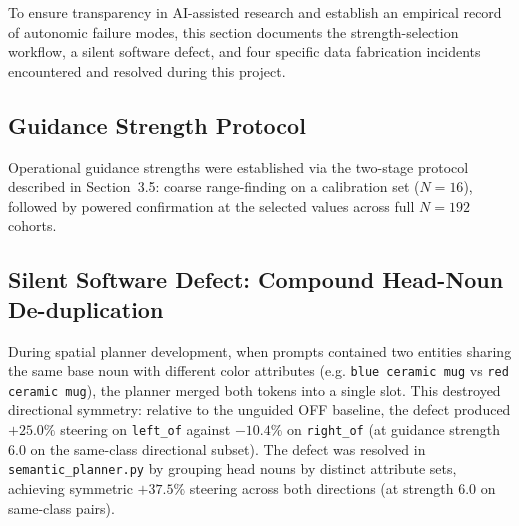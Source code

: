 \documentclass[10pt,twocolumn,letterpaper]{article}
\begin{document}
To ensure transparency in AI-assisted research and establish an empirical record of autonomic failure modes, this section documents the strength-selection workflow, a silent software defect, and four specific data fabrication incidents encountered and resolved during this project.

\subsection{Guidance Strength Protocol}
Operational guidance strengths were established via the two-stage protocol described in Section~3.5: coarse range-finding on a calibration set ($N = 16$), followed by powered confirmation at the selected values across full $N = 192$ cohorts.

\subsection{Silent Software Defect: Compound Head-Noun De-duplication}
During spatial planner development, when prompts contained two entities sharing the same base noun with different color attributes (e.g. \texttt{blue ceramic mug} vs \texttt{red ceramic mug}), the planner merged both tokens into a single slot. This destroyed directional symmetry: relative to the unguided OFF baseline, the defect produced $+25.0\%$ steering on \texttt{left\_of} against $-10.4\%$ on \texttt{right\_of} (at guidance strength 6.0 on the same-class directional subset). The defect was resolved in \texttt{semantic\_planner.py} by grouping head nouns by distinct attribute sets, achieving symmetric $+37.5\%$ steering across both directions (at strength 6.0 on same-class pairs).
\end{document}

